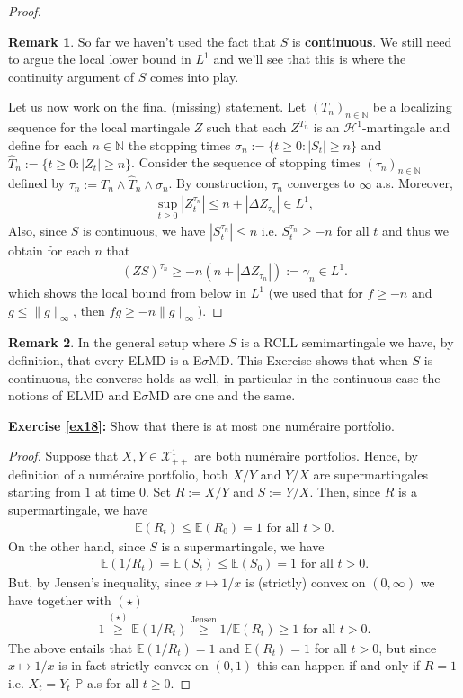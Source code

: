 \documentclass[12pt,a4paper, twoside]{article}
\theoremstyle{definition}
\newtheorem{rem}{Remark}[section]
\newcommand{\EE}{\mathbb{E}} %
\newcommand{\PP}{\mathbb{P}} %
\begin{document}
\begin{proof}
\begin{rem} So far we haven't used the fact that $S$ is \textbf{continuous}. We still need to argue the local lower bound in $L^1$ and we'll see that this is where the continuity argument of $S$ comes into play. 
\end{rem}
\noindent Let us now work on the final (missing) statement. Let $(T_n)_{n \in \mathbb{N}}$ be a localizing sequence for the local martingale $Z$ such that each $Z^{T_n}$ is an $\mathcal{H}^1$-martingale and define for each $n \in \mathbb{N}$ the stopping times $\sigma_n:= \{ t \geq 0 : |S_t| \geq n\}$ and $\hat{T}_n:= \{ t \geq 0 : |Z_t| \geq n\}$. Consider the sequence of stopping times $( \tau_n)_{n \in \mathbb{N}}$ defined by $\tau_n:= T_n \wedge \hat{T}_n \wedge \sigma_n$. By construction, $\tau_n$ converges to $\infty$ a.s. Moreover, 
\begin{align*}
\sup_{t \geq 0} |Z_t^{\tau_n}| \leq n + | \Delta Z_{\tau_n}| \in L^1,
\end{align*}
Also, since $S$ is continuous, we have $|S_t^{\tau_n}| \leq n$ i.e. $S_t^{\tau_n} \geq -n$ for all $t$ and thus we obtain for each $n$ that
\begin{align*}
(ZS)^{\tau_n} \geq -n(n+ | \Delta Z_{\tau_n}|):= \gamma_n \in L^1.
\end{align*}
which shows the local bound from below in $L^1$ (we used that for $f \geq -n$ and $g \leq \|g\|_\infty$, then $fg \geq -n \|g\|_\infty$).
\end{proof}
\begin{rem} In the general setup where $S$ is a RCLL semimartingale we have, by definition,  that every ELMD is a E$\sigma$MD. This Exercise shows that when $S$ is continuous, the converse holds as well, in particular in the continuous case the notions of ELMD and E$\sigma$MD are one and the same. 
\end{rem}
\noindent \textbf{Exercise \ref{ex18}:} Show that there is at most one numéraire portfolio.
\begin{proof}
Suppose that $X,Y \in \mathcal{X}_{++}^1$ are both numéraire portfolios. Hence, by definition of a numéraire portfolio, both $X/Y$ and $Y/X$ are supermartingales starting from $1$ at time $0$. Set $R:= X/Y$ and $S:=Y/X$. Then, since $R$ is a supermartingale, we have \begin{align*}
\EE(R_t) \leq \EE(R_0)=1 \text{ for all } t>0.
\end{align*}
On the other hand, since $S$ is a supermartingale, we have 
\begin{align*}
\EE(1/R_t)= \EE(S_t) \leq \EE(S_0) =1 \text{ for all } t>0. \tag{$\star$}
\end{align*}
But, by Jensen's inequality, since $x \mapsto 1/x$ is (strictly) convex on $(0, \infty)$ we have together with $(\star)$
\begin{align*}
1 \overset{(\star)}\geq \EE(1/R_t) \overset{\text{Jensen}}\geq 1/\EE(R_t) \geq 1 \text{ for all } t>0.
\end{align*}
The above entails that $\EE(1/R_t)=1$ and $\EE(R_t)=1$ for all $t>0$, but since $x \mapsto 1/x$ is in fact strictly convex on $(0,1)$ this can happen if and only if $R=1$ i.e. $X_t=Y_t$ $\PP$-a.s for all $t \geq 0$. 
\end{proof}
\end{document}
